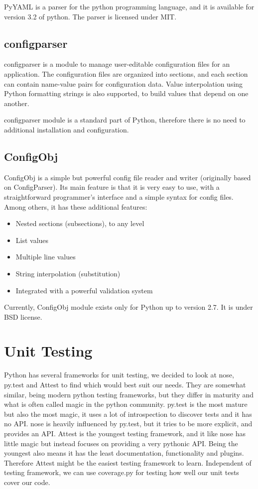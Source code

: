 PyYAML is a parser for the python programming language, and it is available for
version 3.2 of python. The parser is licensed under MIT.

\subsection{configparser}
configparser is a module to manage user-editable configuration files for an
application. The configuration files are organized into sections, and each
section can contain name-value pairs for configuration data. Value
interpolation using Python formatting strings is also supported, to build
values that depend on one another.

configparser module is a standard part of Python, therefore there is no need
to additional installation and configuration.

\subsection{ConfigObj}
ConfigObj is a simple but powerful config file reader and writer (originally
based on ConfigParser). Its main feature is that it is very easy to use, with
a straightforward programmer's interface and a simple syntax for config files.
Among others, it has these additional features:
\begin{itemize}
	\item Nested sections (subsections), to any level
	\item List values
	\item Multiple line values
	\item String interpolation (substitution)
	\item Integrated with a powerful validation system
\end{itemize}

\noindent Currently, ConfigObj module exists only for Python up to version
2.7. It is under BSD license.


\section{Unit Testing}
\label{sec:pre:testing}
Python has several frameworks for unit testing, we decided to look at nose,
py.test and Attest to find which would best suit our needs. They are somewhat
similar, being modern python testing frameworks, but they differ in maturity
and what is often called magic in the python community. py.test is the most
mature but also the most magic, it uses a lot of introspection to discover
tests and it has no API. nose is heavily influenced by py.test, but it tries to
be more explicit, and provides an API. Attest is the youngest testing
framework, and it like nose has little magic but instead focuses on providing
a very pythonic API. Being the youngest also means it has the least
documentation, functionality and plugins. Therefore Attest might be the easiest
testing framework to learn. Independent of testing framework, we can use
coverage.py for testing how well our unit tests cover our code.


